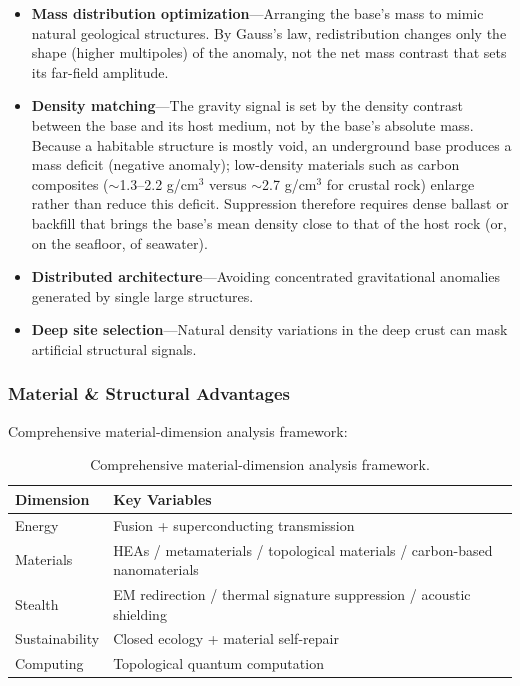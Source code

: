 \documentclass[aps,prd,twocolumn,superscriptaddress,nofootinbib]{revtex4-2}
\begin{document}
\begin{itemize}
  \item \textbf{Mass distribution optimization}---Arranging the base's mass to mimic natural geological structures. By Gauss's law, redistribution changes only the shape (higher multipoles) of the anomaly, not the net mass contrast that sets its far-field amplitude.
  \item \textbf{Density matching}---The gravity signal is set by the density contrast between the base and its host medium, not by the base's absolute mass. Because a habitable structure is mostly void, an underground base produces a mass deficit (negative anomaly); low-density materials such as carbon composites (${\sim}$1.3--2.2 g/cm$^{3}$ versus ${\sim}$2.7 g/cm$^{3}$ for crustal rock) enlarge rather than reduce this deficit. Suppression therefore requires dense ballast or backfill that brings the base's mean density close to that of the host rock (or, on the seafloor, of seawater).
  \item \textbf{Distributed architecture}---Avoiding concentrated gravitational anomalies generated by single large structures.
  \item \textbf{Deep site selection}---Natural density variations in the deep crust can mask artificial structural signals.
\end{itemize}

\subsubsection{Material \& Structural Advantages}\label{sec:material-advantages}

Comprehensive material-dimension analysis framework:

\begin{table}[htbp]
\caption{Comprehensive material-dimension analysis framework.}
\label{tab:material-framework}
\begin{tabular}{ll}
\toprule
Dimension & Key Variables \\
\midrule
Energy & Fusion + superconducting transmission \\
Materials & HEAs / metamaterials / topological materials / carbon-based nanomaterials \\
Stealth & EM redirection / thermal signature suppression / acoustic shielding \\
Sustainability & Closed ecology + material self-repair \\
Computing & Topological quantum computation \\
\bottomrule
\end{tabular}
\end{table}
\end{document}
